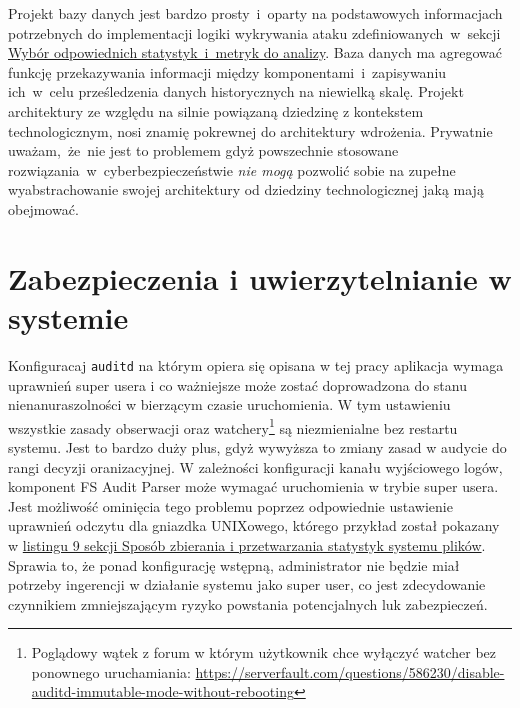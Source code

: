 Projekt bazy danych jest bardzo prosty~i~oparty na podstawowych informacjach potrzebnych do implementacji logiki wykrywania ataku zdefiniowanych~w~sekcji \hyperref[sec:wybor]{Wybór odpowiednich statystyk~i~metryk do analizy}. Baza danych ma agregować funkcję przekazywania informacji między komponentami~i~zapisywaniu ich~w~celu prześledzenia danych historycznych na niewielką skalę.
\newline
Projekt architektury ze względu na silnie powiązaną dziedzinę z kontekstem technologicznym, nosi znamię pokrewnej do architektury wdrożenia. Prywatnie uważam,~że~nie jest to problemem gdyż powszechnie stosowane rozwiązania~w~cyberbezpieczeństwie \emph{nie mogą} pozwolić sobie na zupełne wyabstrachowanie swojej architektury od dziedziny technologicznej jaką mają obejmować.
\section{Zabezpieczenia i uwierzytelnianie w systemie}
Konfiguracaj \texttt{auditd} na którym opiera się opisana w tej pracy aplikacja wymaga uprawnień super usera i co ważniejsze może zostać doprowadzona do stanu nienanuraszolności w bierzącym czasie uruchomienia. W tym ustawieniu wszystkie zasady obserwacji oraz watchery\footnote{Poglądowy wątek z forum w którym użytkownik chce wyłączyć watcher bez ponownego uruchamiania: \url{https://serverfault.com/questions/586230/disable-auditd-immutable-mode-without-rebooting}} są niezmienialne bez restartu systemu. Jest to bardzo duży plus, gdyż wywyższa to zmiany zasad w audycie do rangi decyzji oranizacyjnej. W zależności konfiguracji kanału wyjściowego logów, komponent FS Audit Parser może wymagać uruchomienia w trybie super usera. Jest możliwość ominięcia tego problemu poprzez odpowiednie ustawienie uprawnień odczytu dla gniazdka UNIXowego, którego przykład został pokazany w \hyperref[lst:cipendejs]{listingu 9 sekcji Sposób zbierania i przetwarzania statystyk systemu plików}. Sprawia to, że ponad konfigurację wstępną, administrator nie będzie miał potrzeby ingerencji w działanie systemu jako super user, co jest zdecydowanie czynnikiem zmniejszającym ryzyko powstania potencjalnych luk zabezpieczeń.

